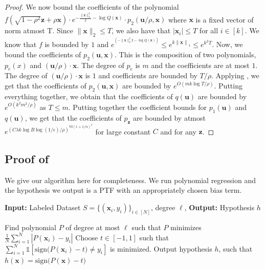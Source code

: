 \documentclass[10pt,a4paper]{article}
\newcommand\twonorm[1]{\|#1\|_2}
\newcommand\norm[1]{\left\| #1 \right\|}
\renewcommand\vec[1]{\mathbf{#1}}
\newcommand{\sign}{\mathrm{sign}}
\newcommand{\1}{\Ind}
\newcommand{\x}{\vec x}
\newcommand{\vu}{\vec u}
\newcommand{\z}{\vec z}
\newcommand{\ind}{\mathds{1}}
\begin{document}
\begin{proof}
We now bound the coefficients of the polynomial $f(\sqrt{1-\rho^2}\z+\rho\x)\cdot e^{-\frac{\twonorm{\x}^2}{2}-\log Q(\x)}\cdot p_2(\vu/\rho,\x)$ where $\x$ is a fixed vector of norm atmost T. Since $\twonorm{\x}\leq T$, we also have that $|\x_i|\leq T$ for all $i\in [k]$. We know that $f$ is bounded by $1$ and $e^{^{\left(-{\twonorm{\x}^2}{2} -\log Q(\x)\right)}}\leq e^{k\norm{\x}_1}\leq e^{k^2T}$. Now, we bound the coefficients of $p_2(\vu,\x)$. This is the composition of two polynomials, $p_e(x)$ and $(\vu/\rho)\cdot \x$. The degree of $p_e$ is $m$ and the coefficients are at most $1$. The degree of $(\vu/\rho)\cdot \x$ is $1$ and coefficients are bounded by $T/\rho$. Applying , we get that the coefficients of $p_2(\vu,\x)$ are bounded by $e^{O\left(mk\log T/\rho\right)}$.  Putting everything together, we obtain that the coefficients of $q(\vu)$ are bounded by $e^{O({k^2m^2/\rho})}$ as $T\leq m$. Putting together the coefficient bounds for $p_1(\vu)$ and $q(\vu)$, we get that the coefficients of $p_{\z}$ are bounded by atmost $e^{\left(C\lambda k\log B\log (1/\epsilon)/\rho\right)^{70(1+1/\alpha)^3}}$ for large constant $C$ and for any $\z$.
\end{proof}

\subsection{\texorpdfstring{Proof of }{Proof of Theorem D.7}}
We give our algorithm here for completeness. We run polynomial regression and the hypothesis we output is a PTF with an appropriately chosen bias term.



\iffalse
 \begin{algorithm} 
  \caption{Agnostic Learner for Smooth Boolean Concepts}
  \label{alg:smooth_boolean}
\begin{algorithmic}
  
\STATE \textbf{Input:} Labeled Dataset $S=\{(\x_i,y_i)\}_{i\in [N]}$, degree $\ell$,
\STATE \textbf{Output:} Hypothesis $h$
\STATE 

\STATE Find polynomial $P$ of degree at most $\ell$ such that $P$ minimizes $\frac{1}{N}\sum_{i=1}^{N}|P(\x_i)-y_i|$
\STATE Choose $t\in [-1,1]$ such that $\sum_{i=1}^{N}\ind[\sign\bigl(P(\x_i)-t\bigr)\neq y_i]$ is minimized.
\STATE Output hypothesis $h$, such that $h(\x)=\sign\bigl(P(\x)-t\bigr)$

\end{algorithmic}
\end{algorithm}
\end{document}
